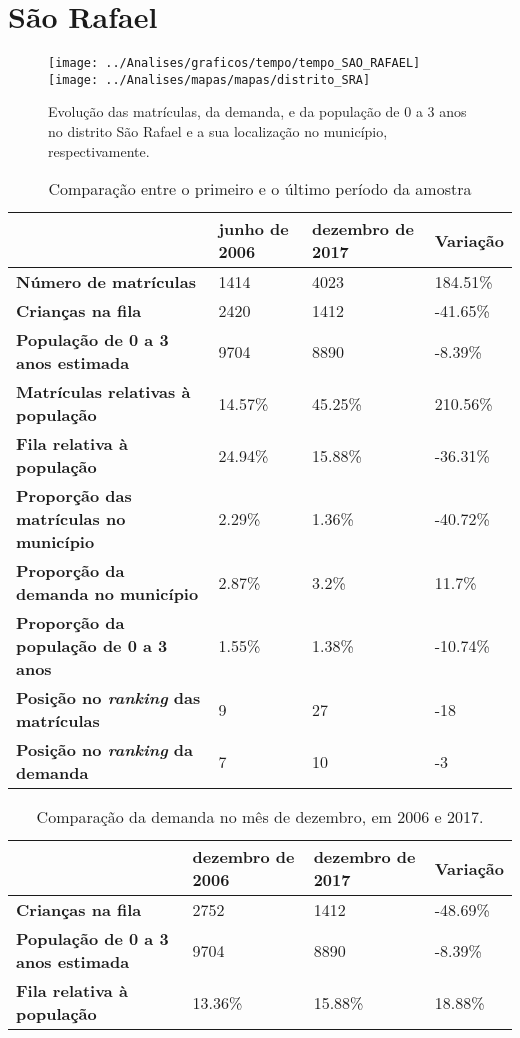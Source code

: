 \section{São Rafael}
\begin{figure}[H]
\centering
\texttt{[image: ../Analises/graficos/tempo/tempo\_SAO\_RAFAEL]}
\texttt{[image: ../Analises/mapas/mapas/distrito\_SRA]}
\caption{Evolução das matrículas, da demanda, e da população de 0 a 3 anos no distrito São Rafael e a sua localização no município, respectivamente.}
\end{figure}
\begin{table}[H]
\begin{tabular}{l|l|l|l}
\textbf{}                                      & \textbf{junho de 2006}       & \textbf{dezembro de 2017}    & \textbf{Variação} \\ \hline
\textbf{Número de matrículas}                  & 1414 & 4023 & 184.51\% \\ \hline
\textbf{Crianças na fila}                      & 2420 & 1412 & -41.65\% \\ \hline
\textbf{População de 0 a 3 anos estimada}      & 9704 & 8890 & -8.39\% \\ \hline
\textbf{Matrículas relativas à população}      & 14.57\% & 45.25\% & 210.56\% \\ \hline
\textbf{Fila relativa à população}             & 24.94\% & 15.88\% & -36.31\% \\ \hline
\textbf{Proporção das matrículas no município} & 2.29\% & 1.36\% & -40.72\% \\ \hline
\textbf{Proporção da demanda no município}     & 2.87\% & 3.2\% & 11.7\% \\ \hline
\textbf{Proporção da população de 0 a 3 anos}  & 1.55\% & 1.38\% & -10.74\% \\ \hline
\textbf{Posição no \textit{ranking} das matrículas}     & 9 & 27 & -18 \\ \hline
\textbf{Posição no \textit{ranking} da demanda}         & 7 & 10 & -3 \\ 
\end{tabular}
\caption{Comparação entre o primeiro e o último período da amostra}
\end{table}
\begin{table}[H]
\begin{tabular}{l|l|l|l}
\textbf{}                                 & \textbf{dezembro de 2006} & \textbf{dezembro de 2017} & \textbf{Variação} \\ \hline
\textbf{Crianças na fila}                      & 2752 & 1412 & -48.69\% \\ \hline
\textbf{População de 0 a 3 anos estimada}      & 9704 & 8890 & -8.39\% \\ \hline
\textbf{Fila relativa à população}             & 13.36\% & 15.88\% & 18.88\% \\
\end{tabular}
\caption{Comparação da demanda no mês de dezembro, em 2006 e 2017.}
\end{table}
